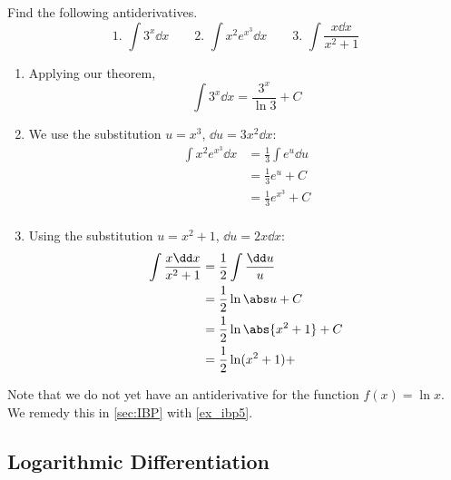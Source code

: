 \begin{example}\label{ex_exp_log_anti}
Find the following antiderivatives.
\[
 \text{1. }\int 3^x\dd x\qquad
 \text{2. }\int x^2 e^{x^3}\dd x\qquad
 \text{3. }\int \frac{x\dd x}{x^2+1}
\]
\solution
\begin{enumerate}
\item Applying our theorem,
\[\int 3^x\dd x=\frac{3^x}{\ln 3}+C\]
\item We use the substitution $u=x^3$, $\dd u=3x^2\dd x$:
\begin{align*}
\int x^2e^{x^3}\dd x &=\frac13 \int e^u\dd u\\
&=\frac 13 e^u+C\\
&=\frac 13 e^{x^3}+C\\
\end{align*}
\item Using the substitution $u=x^2+1$, $\dd u=2x\dd x$:
\begin{align*}
\int \frac{x\dd x}{x^2+1}&=\frac 12 \int \frac{\dd u}{u}\\
&=\frac 12 \ln\abs u+C\\
&=\frac 12 \ln\abs{x^2+1}+C\\
&=\frac 12 \ln(x^2+1)+
\end{align*}
\end{enumerate}
\end{example}

Note that we do not yet have an antiderivative for the function $f(x)=\ln x$. We remedy this in \autoref{sec:IBP} with \autoref{ex_ibp5}.

%
%

\subsection{Logarithmic Differentiation}


